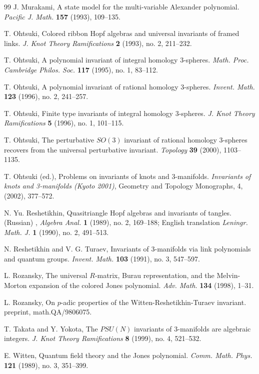 \documentclass{amsart}
\numberwithin{equation}{section}
\numberwithin{figure}{section}
\theoremstyle{plain}
\theoremstyle{definition}
\theoremstyle{remark}
\begin{document}
\begin{thebibliography}{99}
J. Murakami,
A state model for the multi-variable Alexander polynomial.
{\it Pacific J. Math.} {\bf 157} (1993), 109--135.

T. Ohtsuki,
Colored ribbon Hopf algebras and universal invariants of framed links.
{\it J. Knot Theory Ramifications} {\bf 2} (1993), no. 2, 211--232.

T. Ohtsuki,
A polynomial invariant of integral homology $3$-spheres.
{\it Math. Proc. Cambridge Philos. Soc.} {\bf 117} (1995), no. 1, 83--112.

T. Ohtsuki,
A polynomial invariant of rational homology $3$-spheres.
{\it Invent. Math.} {\bf 123} (1996), no. 2, 241--257.

T. Ohtsuki,
Finite type invariants of integral homology $3$-spheres.
{\it J. Knot Theory Ramifications} {\bf 5} (1996), no. 1, 101--115.

T. Ohtsuki,
The perturbative $SO(3)$ invariant of rational homology $3$-spheres recovers from the universal perturbative invariant.
{\it Topology} {\bf 39} (2000), 1103--1135.

T. Ohtsuki (ed.),
Problems on invariants of knots and $3$-manifolds.
{\it Invariants of knots and 3-manifolds (Kyoto 2001)},
Geometry and Topology Monographs, 4, (2002), 377--572.

N. Yu. Reshetikhin,
Quasitriangle Hopf algebras and invariants of tangles. (Russian)
, {\it Algebra Anal.}
  {\bf 1} (1989), no. 2, 169--188; English translation {\it
  Leningr. Math. J.} {\bf 1} (1990), no. 2, 491--513.

N. Reshetikhin and V. G. Turaev,
Invariants of $3$-manifolds via link polynomials and quantum groups.
{\it Invent. Math.} {\bf 103} (1991), no. 3, 547--597.

L. Rozansky,
The universal $R$-matrix, Burau representation, and the Melvin-Morton
expansion of the colored Jones polynomial.
{\it Adv. Math.} {\bf 134} (1998), 1--31.

L. Rozansky,
On $p$-adic properties of the Witten-Reshetikhin-Turaev invariant.
preprint, math.QA/9806075.

T. Takata and Y. Yokota,
The $PSU(N)$ invariants of $3$-manifolds are algebraic integers.
{\it J. Knot Theory Ramifications} {\bf 8} (1999), no. 4, 521--532.

E. Witten,
Quantum field theory and the Jones polynomial.
{\it Comm. Math. Phys.} {\bf 121}  (1989),  no. 3, 351--399.
\end{thebibliography}
\end{document}
